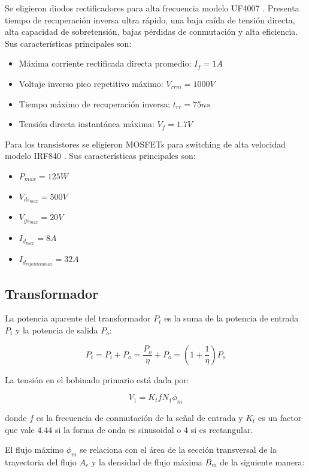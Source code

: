 Se eligieron diodos rectificadores para alta frecuencia modelo UF4007 \cite{uf4007}. 
Presenta tiempo de recuperación inversa ultra rápido, una baja caída de tensión directa, alta capacidad de sobretensión, bajas pérdidas de conmutación y alta eficiencia.
Sus características principales son: 

\begin{itemize}
    \item Máxima corriente rectificada directa promedio: $I_f=1A$
    \item Voltaje inverso pico repetitivo máximo: $V_{rrm}=1000V$
    \item Tiempo máximo de recuperación inversa: $t_{rr}=75ns$
    \item Tensión directa instantánea máxima: $V_f=1.7V$
\end{itemize}

Para los transistores se eligieron MOSFETs para switching de alta velocidad modelo IRF840 \cite{IRF840}. 
Sus características principales son: 

\begin{itemize}
    \item $P_{max}=125W$
    \item $V_{ds_{max}}=500V$
    \item $V_{gs_{max}}=20V$
    \item $I_{d_{max}}=8A$
    \item $I_{d_{repetitiva max}}=32A$
\end{itemize}

\subsection{Transformador}

La potencia aparente del transformador $P_{t}$ es la suma de la potencia de entrada $P_{i}$ y la potencia de salida $P_{o}$:

$$ P_{t}=P_{i}+P_{o}=\frac{P_{o}}{\eta}+P_{o}=\left(1+\frac{1}{\eta}\right)P_{o} $$

La tensión en el bobinado primario está dada por: 

$$ V_{1}=K_{t} f N_{1} \phi_{m} $$

donde $f$ es la frecuencia de conmutación de la señal de entrada y 
$K_t$ es un factor que vale $4.44$ si la forma de onda es sinusoidal o $4$ si es rectangular.

El flujo máximo $\phi_{m}$ se relaciona con el área de la sección transversal de la trayectoria del flujo $A_{e}$ y la densidad de flujo máxima $B_{m}$ de la siguiente manera:


